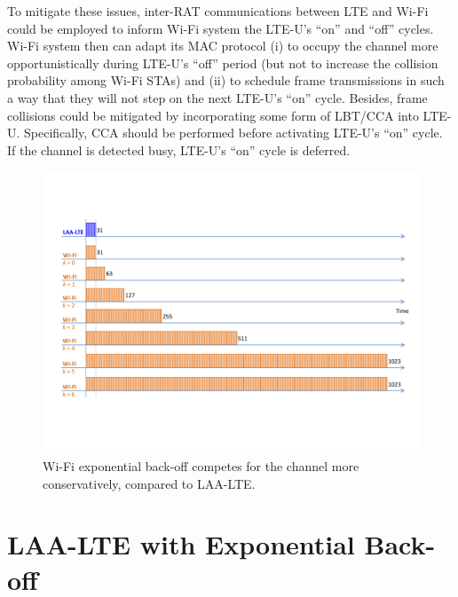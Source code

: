 To mitigate these issues, inter-RAT communications between LTE and Wi-Fi could be employed to inform Wi-Fi system the LTE-U's ``on'' and ``off'' cycles. Wi-Fi system then can adapt its MAC protocol (i) to occupy the channel more opportunistically during LTE-U's ``off'' period (but not to increase the collision probability among Wi-Fi STAs) and (ii) to schedule frame transmissions in such a way that they will not step on the next LTE-U's ``on'' cycle. Besides, frame collisions could be mitigated by incorporating some form of LBT/CCA into LTE-U. Specifically, CCA should be performed before activating LTE-U's ``on'' cycle. If the channel is detected busy, LTE-U's ``on'' cycle is deferred.

\begin{figure}[!t]
	\centering
	\includegraphics[width=1.0\columnwidth]{figures2/LAA-LTE-enhacement-back-off}
	\caption{Wi-Fi exponential back-off competes for the channel more conservatively, compared to LAA-LTE.}
	\label{figs:LAA-LTE-enhacement-back-off}
\end{figure}

\section{LAA-LTE with Exponential Back-off}
\label{subsection:exp-back-off}

